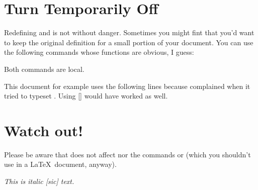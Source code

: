 \documentclass[DIV10,toc=index,toc=bib]{cnpkgdoc}
\begin{document}
\section{Turn \embrac Temporarily Off}
Redefining  and  is not without danger. Sometimes you might
fint that you'd want to keep the original definition for a small portion of your
document. You can use the following commands whose functions are obvious, I guess:
\begin{beschreibung}
\end{beschreibung}
Both commands are local.

This document for example uses the following lines because 
complained when it tried to typeset \cite{bringhurst04}. Using []
would have worked as well.
\begin{beispiel}
 \EmbracOff
 \printbibliography
\end{beispiel}

\section{Watch out!}
Please be aware that \embrac does not affect  nor the commands
 or  (which you shouldn't use in a \LaTeX\ document, anyway).
\begin{beispiel}
 \itshape This is italic [sic] text.
\end{beispiel}

\EmbracOff
\printbibliography


\printindex
\end{document}
